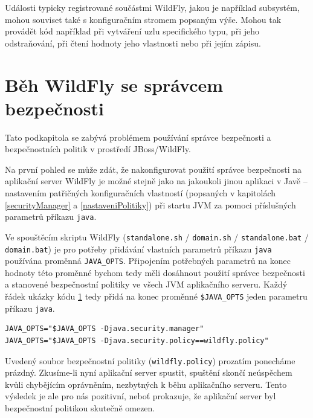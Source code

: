 Události typicky registrované součástmi WildFly, jakou je například subsystém, mohou souviset také s konfiguračním stromem popsaným výše.
Mohou tak provádět kód například při vytváření uzlu specifického typu, při jeho odstraňování, při čtení hodnoty jeho vlastnosti nebo při jejím zápisu.
\cite{WildFlyExtending}

\section{Běh WildFly se správcem bezpečnosti} \label{wildflySeSM}

Tato podkapitola se zabývá problémem používání správce bezpečnosti a bezpečnostních politik v prostředí JBoss/WildFly.

Na první pohled se může zdát, že nakonfigurovat použití správce bezpečnosti na aplikační server WildFly je možné stejně jako na jakoukoli jinou aplikaci v Javě -- nastavením patřičných konfiguračních vlastností (popsaných v kapitolách \ref{securityManager} a \ref{nastaveniPolitiky}) při startu JVM za pomoci příslušných parametrů příkazu {\tt java}.

Ve spouštěcím skriptu WildFly ({\tt standalone.sh} / {\tt domain.sh} / {\tt standalone.bat} / {\tt domain.bat}) je pro potřeby přidávání vlastních parametrů příkazu {\tt java} používána proměnná {\tt JAVA\_OPTS}.
Připojením potřebných parametrů na konec hodnoty této proměnné bychom tedy měli dosáhnout použití správce bezpečnosti a stanovené bezpečnostní politiky ve všech JVM aplikačního serveru. Každý řádek ukázky kódu \ref{wildflySeSM} tedy přidá na konec proměnné {\tt \$JAVA\_OPTS} jeden parametru příkazu {\tt java}. \cite{jbossSecurityManager}

\begin{lstlisting}[caption=Doplnění spouštěcího skriptu o použití správce bezpečnosti, label=wildflySeSM]
JAVA_OPTS="$JAVA_OPTS -Djava.security.manager"
JAVA_OPTS="$JAVA_OPTS -Djava.security.policy==wildfly.policy"
\end{lstlisting}

Uvedený soubor bezpečnostní politiky ({\tt wildfly.policy}) prozatím ponecháme prázdný.
Zkusíme-li nyní aplikační server spustit, spuštění skončí neúspěchem kvůli chybějícím oprávněním, nezbytných k běhu aplikačního serveru. Tento výsledek je ale pro nás pozitivní, neboť prokazuje, že aplikační server byl bezpečnostní politikou skutečně omezen.


